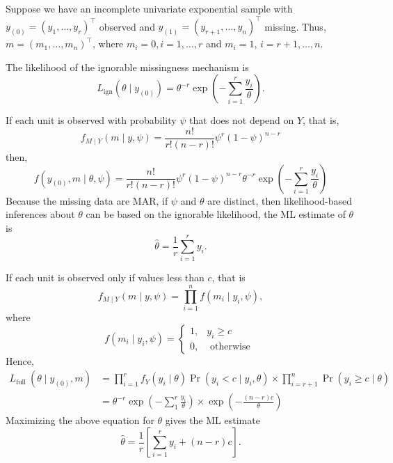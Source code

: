\begin{example}
	Suppose we have an incomplete univariate exponential sample with \(y_{(0)}=\left(y_{1},\ldots,y_{r}\right)^{\top}\) observed and \(y_{(1)}=\left(y_{r+1},\ldots,y_{n}\right)^{\top}\) missing. Thus, \(m=\left(m_{1},\ldots,m_{n}\right)^{\top}\), where \(m_{i}=0,i=1,\ldots,r\) and \(m_{i}=1\), \(i=r+1,\ldots,n\).

	The likelihood of the ignorable missingness mechanism is
	\begin{equation}
		L_{\mathrm{ign}}\left(\theta\mid y_{(0)}\right)=\theta^{-r}\exp\left(-\sum_{i=1}^{r}\frac{y_{i}}{\theta}\right).
	\end{equation}

	If each unit is observed with probability \(\psi\) that does not depend on \(Y\), that is,
	\begin{equation}
		f_{M\mid Y}(m\mid y,\psi)=\frac{n!}{r!(n-r)!}\psi^{r}(1-\psi)^{n-r}
	\end{equation}
	then,
	\begin{equation}
		f\left(y_{(0)},m\mid\theta,\psi\right)=\frac{n!}{r!(n-r)!}\psi^{r}(1-\psi)^{n-r}\theta^{-r}\exp\left(-\sum_{i=1}^{r}\frac{y_{i}}{\theta}\right)
	\end{equation}
	Because the missing data are MAR, if \(\psi\) and \(\theta\) are distinct, then likelihood-based
	inferences about \(\theta\) can be based on the ignorable likelihood, the ML estimate of \(\theta\) is
	\begin{equation}
		\hat{\theta}=\frac{1}{r}\sum_{i=1}^{r}y_{i}.
	\end{equation}

	If each unit is observed only if values less than \(c\), that is
	\begin{equation}
		f_{M\mid Y}(m\mid y,\psi)=\prod_{i=1}^{n}f\left(m_{i}\mid y_{i},\psi\right),
	\end{equation}
	where
	\begin{equation}
		f\left(m_{i} \mid y_{i}, \psi\right)=\left\{\begin{array}{ll}
			1, & y_{i}\geq c        \\
			0, & \text{ otherwise }
		\end{array}\right.
	\end{equation}
	Hence,
	\begin{equation}
		\begin{aligned}
			L_{\text {full }}\left(\theta \mid y_{(0)}, m\right) & =\prod_{i=1}^{r} f_{Y}\left(y_{i} \mid \theta\right)\Pr\left(y_{i}<c \mid y_{i}, \theta\right) \times \prod_{i=r+1}^{n}\Pr\left(y_{i} \geq c \mid \theta\right) \\
			                                                     & =\theta^{-r} \exp \left(-\sum_{1}^{r} \frac{y_{i}}{\theta}\right) \times \exp \left(-\frac{(n-r) c}{\theta}\right)
		\end{aligned}
	\end{equation}
	Maximizing the above equation for \(\theta\) gives the ML estimate
	\begin{equation}
		\hat{\theta}=\frac{1}{r}\left[\sum_{i=1}^{r}y_{i}+(n-r)c\right].
	\end{equation}


\end{example}
